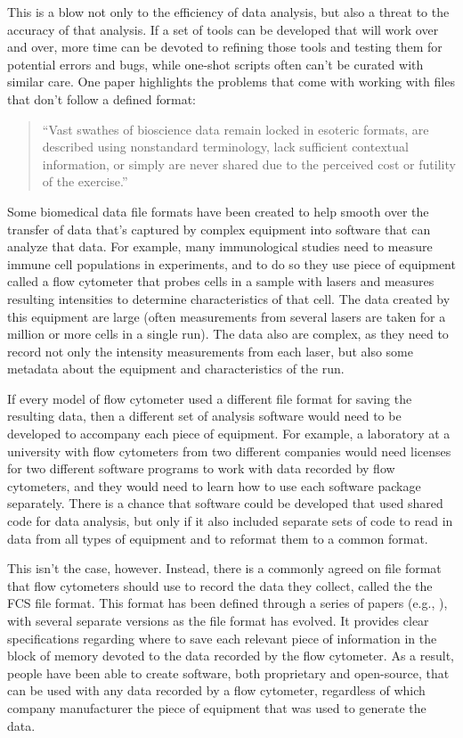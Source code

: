 \documentclass[]{tufte-book}
\begin{document}
This is a blow not only to the efficiency of data analysis, but also a
threat to the accuracy of that analysis. If a set of tools can be developed that
will work over and over, more time can be devoted to refining those tools and
testing them for potential errors and bugs, while one-shot scripts often can't
be curated with similar care. One paper highlights the problems that come with
working with files that don't follow a defined format:

\begin{quote}
``Vast swathes of bioscience data remain locked in esoteric formats, are
described using nonstandard terminology, lack sufficient contextual information,
or simply are never shared due to the perceived cost or futility of the
exercise.'' \citep{sansone2012toward}
\end{quote}

Some biomedical data file formats have been created to help smooth over the
transfer of data that's captured by complex equipment into software that can
analyze that data. For example, many immunological studies need to measure
immune cell populations in experiments, and to do so they use piece of equipment
called a flow cytometer that probes cells in a sample with lasers and measures
resulting intensities to determine characteristics of that cell. The data
created by this equipment are large (often measurements from several lasers are
taken for a million or more cells in a single run). The data also are complex, as
they need to record not only the intensity measurements from each laser, but
also some metadata about the equipment and characteristics of the run.

If every model of flow cytometer used a different file format for
saving the resulting data, then a different set of analysis software would need
to be developed to accompany each piece of equipment. For example, a laboratory
at a university with flow cytometers from two different companies would need
licenses for two different software programs to work with data recorded by flow
cytometers, and they would need to learn how to use each software package
separately. There is a chance that software could be developed that used shared
code for data analysis, but only if it also included separate sets of code to
read in data from all types of equipment and to reformat them to a common
format.

This isn't the case, however. Instead, there is a commonly agreed on file format
that flow cytometers should use to record the data they collect, called the the
FCS file format. This format has been defined through a series of papers
(e.g., \citet{spidlen2021data}), with several separate versions as the file format
has evolved. It provides clear specifications regarding where to save each relevant
piece of information in the block of memory devoted to the data recorded by the
flow cytometer. As a result, people have been able
to create software, both proprietary and open-source, that can be used with any
data recorded by a flow cytometer, regardless of which company manufacturer the
piece of equipment that was used to generate the data.
\end{document}
